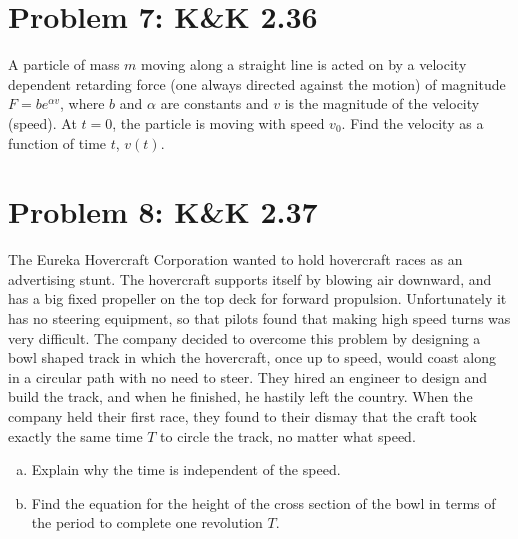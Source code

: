 \documentclass[problems]{esg8012pset}
\begin{document}
\section*{Problem 7: K\&K 2.36}
  A particle of mass $m$ moving along a straight line is acted on by a velocity dependent retarding force (one always directed against the motion) of magnitude $F = be^{\alpha v}$, where $b$ and $\alpha$ are constants and $v$ is the magnitude of the velocity (speed). At $t = 0$, the particle is moving with speed $v_0$. Find the velocity as a function of time $t$, $v(t)$.
\section*{Problem 8: K\&K 2.37}
  The Eureka Hovercraft Corporation wanted to hold hovercraft races as an advertising stunt. The hovercraft supports itself by blowing air downward, and has a big fixed propeller on the top deck for forward propulsion. Unfortunately it has no steering equipment, so that pilots found that making high speed turns was very difficult. The company decided to overcome this problem by designing a bowl shaped track in which the hovercraft, once up to speed, would coast along in a circular path with no need to steer. They hired an engineer to design and build the track, and when he finished, he hastily left the country. When the company held their first race, they found to their dismay that the craft took exactly the same time $T$ to circle the track, no matter what speed.
  \begin{enumerate}[a)]
    \item Explain why the time is independent of the speed.
    \item Find the equation for the height of the cross section of the bowl in terms of the period to complete one revolution $T$.
  \end{enumerate}
\end{document}
